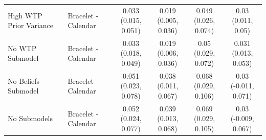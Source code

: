 \documentclass[
]{article}
\begin{document}
\begin{table}
{\begin{tabular}[t]{llcccc}
High WTP Prior Variance & Bracelet - Calendar & \makecell[c]{0.033\\(0.015, 0.051)} & \makecell[c]{0.019\\(0.005, 0.036)} & \makecell[c]{0.049\\(0.026, 0.074)} & \makecell[c]{0.03\\(0.011, 0.05)}\\
No WTP Submodel & Bracelet - Calendar & \makecell[c]{0.033\\(0.018, 0.049)} & \makecell[c]{0.019\\(0.006, 0.036)} & \makecell[c]{0.05\\(0.029, 0.072)} & \makecell[c]{0.031\\(0.013, 0.053)}\\
No Beliefs Submodel & Bracelet - Calendar & \makecell[c]{0.051\\(0.023, 0.078)} & \makecell[c]{0.038\\(0.011, 0.067)} & \makecell[c]{0.068\\(0.029, 0.106)} & \makecell[c]{0.03\\(-0.011, 0.071)}\\
No Submodels & Bracelet - Calendar & \makecell[c]{0.052\\(0.024, 0.077)} & \makecell[c]{0.039\\(0.013, 0.068)} & \makecell[c]{0.069\\(0.029, 0.105)} & \makecell[c]{0.03\\(-0.009, 0.067)}\\
\bottomrule
\end{tabular}}
\end{table}
\end{document}
